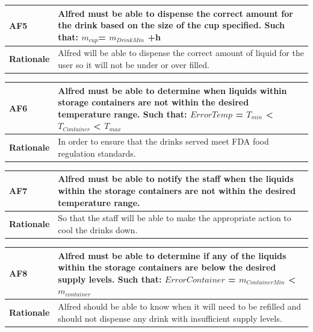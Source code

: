 \documentclass [11pt]{article}
\begin{document}
\begin{longtable}{| p{ } | p{ } | }\hline 
\rowcolor{tableCell}\textbf{AF5} & Alfred must be able to dispense the correct amount for the drink based on the size of the cup specified. Such that:  $m_{cup}$= $ m_{DrinkMin} $ +h \\ \hline
\textbf{Rationale} &  Alfred will be able to dispense the correct amount of liquid for the user so it will not be under or over filled. \\ \hline 
\end{longtable}

\begin{longtable}{| p{ } | p{ } | }\hline 
\rowcolor{tableCell}\textbf{AF6} & Alfred must be able to determine when liquids within storage containers are not within the desired temperature range. Such that: $ErrorTemp$ = $T_{min}$ < $T_{Container}$ < $T_{max}$ \\ \hline
\textbf{Rationale} &  In order to ensure that the drinks served meet FDA food regulation standards. \\ \hline 
\end{longtable}

\begin{longtable}{| p{ } | p{ } | }\hline 
\rowcolor{tableCell}\textbf{AF7} & Alfred must be able to notify the staff when the liquids within the storage containers are not within the desired temperature range.\\ \hline
\textbf{Rationale} &  So that the staff will be able to make the appropriate action to cool the drinks down.\\ \hline 
\end{longtable}

\begin{longtable}{| p{ } | p{ } | }\hline 
\rowcolor{tableCell}\textbf{AF8} & Alfred must be able to determine if any of the liquids within the storage containers are below the desired supply levels. Such that: $ErrorContainer$ = $m_{ContainerMin}$ < $m_{container}$ \\ \hline
\textbf{Rationale} &  Alfred should be able to know when it will need to be refilled and should not dispense any drink with insufficient supply levels.\\ \hline 
\end{longtable}
\end{document}

